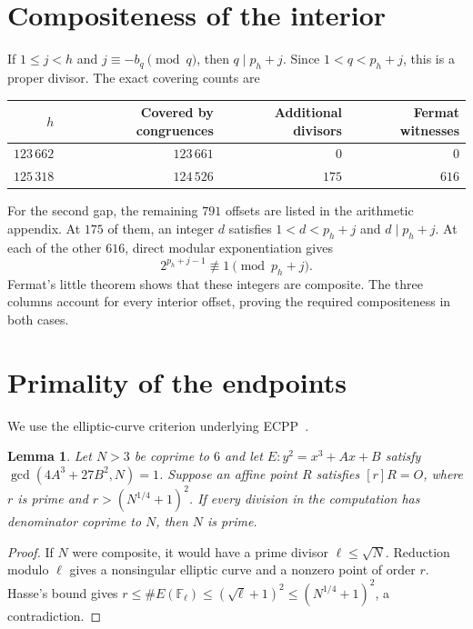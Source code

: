 \documentclass[11pt]{amsart}
\newtheorem{lemma}[theorem]{Lemma}
\begin{document}
\section{Compositeness of the interior}
If $1\le j<h$ and $j\equiv-b_q\pmod q$, then $q\mid p_h+j$.
Since $1<q<p_h+j$, this is a proper divisor. The exact covering counts are
\begin{center}
\begin{tabular}{r r r r}
\toprule
$h$ & Covered by congruences & Additional divisors & Fermat witnesses\\
\midrule
$123\,662$ & $123\,661$ & $0$ & $0$\\
$125\,318$ & $124\,526$ & $175$ & $616$\\
\bottomrule
\end{tabular}
\end{center}
For the second gap, the remaining $791$ offsets are listed in the arithmetic
appendix. At $175$ of them, an integer $d$ satisfies $1<d<p_h+j$ and
$d\mid p_h+j$. At each of the other $616$, direct modular exponentiation gives
\[
 2^{p_h+j-1}\not\equiv1\pmod{p_h+j}.
\]
Fermat's little theorem shows that these integers are composite. The three
columns account for every interior offset, proving the required
compositeness in both cases.

\section{Primality of the endpoints}
We use the elliptic-curve criterion underlying ECPP~\cite{atkinmorain}.
\begin{lemma}\label{lem:ecpp}
Let $N>3$ be coprime to $6$ and let $E:y^2=x^3+Ax+B$ satisfy
$\gcd(4A^3+27B^2,N)=1$. Suppose an affine point $R$ satisfies $[r]R=O$,
where $r$ is prime and $r>(N^{1/4}+1)^2$. If every division in the
computation has denominator coprime to $N$, then $N$ is prime.
\end{lemma}
\begin{proof}
If $N$ were composite, it would have a prime divisor $\ell\le\sqrt N$.
Reduction modulo $\ell$ gives a nonsingular elliptic curve and a nonzero
point of order $r$. Hasse's bound gives
$r\le\#E(\mathbb F_\ell)\le(\sqrt\ell+1)^2\le(N^{1/4}+1)^2$,
a contradiction.
\end{proof}
\end{document}
